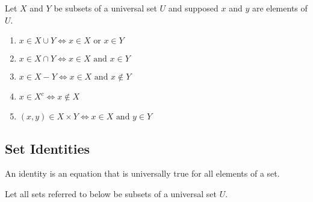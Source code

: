 \documentclass[11pt]{article}
\begin{document}
\begin{definition}\label{def:procedural-set-defs}
    Let $X$ and $Y$ be subsets of a universal set $U$ and supposed $x$ and $y$ are elements of $U$.
    \begin{enumerate}
        \item $x \in X \cup Y \iff x \in X \text{ or } x \in Y$
        \item $x \in X \cap Y \iff x \in X \text{ and } x \in Y$
        \item $x \in X - Y \iff x \in X \text{ and } x \notin Y$
        \item $x \in X^c \iff x \notin X$
        \item $(x,y) \in X \times Y \iff x \in X \text{ and } y \in Y$
    \end{enumerate}
\end{definition}

\subsection{Set Identities}

\begin{definition}[Identity]\label{def:identity}
    An identity is an equation that is universally true for all elements of a set.
\end{definition}

Let all sets referred to below be subsets of a universal set $U$.
\end{document}
